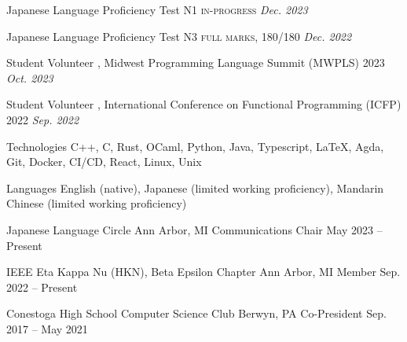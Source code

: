 \documentclass[letterpaper,11pt]{article}
\begin{document}
  \begin{rsectionlist}
    \rsectionitemthin
      {Japanese Language Proficiency Test N1}
      { \textsc{in-progress}}
      {\textit{Dec. 2023}}

    \vspace*{-1em}
    \rsectionitemthin
      {Japanese Language Proficiency Test N3}
      { \textsc{full marks, 180/180}}
      {\textit{Dec. 2022}}
  \end{rsectionlist}

  \begin{rsectionlist}
    \rsectionitemthin
      {Student Volunteer}
      {, Midwest Programming Language Summit (MWPLS) 2023}
      {\textit{Oct. 2023}}

    \vspace*{-1em}
    \rsectionitemthin
      {Student Volunteer}
      {, International Conference on Functional Programming (ICFP) 2022}
      {\textit{Sep. 2022}}
  \end{rsectionlist}

  \begin{rlinelist}
    \rline
      {Technologies}
      {C++, C, Rust, OCaml, Python, Java, Typescript, \LaTeX, Agda,
      Git, Docker, CI/CD, React, Linux, Unix}
      
    \rline
      {Languages}
      {English (native), Japanese (limited working proficiency), Mandarin Chinese (limited working proficiency)}
  \end{rlinelist}

  \begin{rsectionlist}
    \rsectionitem
      {Japanese Language Circle}
      {Ann Arbor, MI}
      {Communications Chair}
      {May 2023 -- Present}


    \rsectionitem
      {IEEE Eta Kappa Nu (HKN), Beta Epsilon Chapter}
      {Ann Arbor, MI}
      {Member}
      {Sep. 2022 -- Present}

    
    \rsectionitem
      {Conestoga High School Computer Science Club}
      {Berwyn, PA}
      {Co-President}
      {Sep. 2017 -- May 2021}

  \end{rsectionlist}
\end{document}
